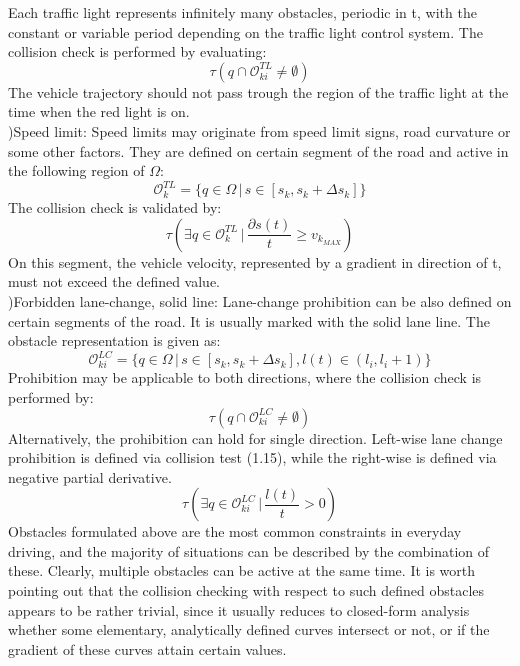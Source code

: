 \documentclass{thesisreport}
\begin{document}
Each traffic light represents infinitely many obstacles, periodic in t, with the constant or variable period depending
on the traffic light control system. The collision check is performed by evaluating:
\begin{equation}
	\tau(q \cap \mathcal{O}_{ki}^{TL} \neq \emptyset)
\end{equation}
The vehicle trajectory should not pass trough the region of the traffic light at the time when the red light is on.\\
)Speed limit: Speed limits may originate from speed limit signs, road curvature or some other factors. They are defined on certain segment of the road and active in the following region of $\Omega$:
\begin{equation}
\mathcal{O}_{k}^{TL} = \{ q \in \Omega\,|\,
s \in [s_k, s_k + \Delta s_k]\}
\end{equation}
The collision check is validated by:
\begin{equation}
\tau(\exists q \in \mathcal{O}_{k}^{TL} \,|\, \frac{\partial s(t)}{t} \geq v_{k_{MAX}} )
\end{equation}
On this segment, the vehicle velocity, represented by a gradient in direction of t, must not exceed the defined value.\\
)Forbidden lane-change, solid line: Lane-change prohibition can be also defined on certain segments of the road. It is usually marked with the solid lane line. The obstacle representation is given as:
\begin{equation}
\mathcal{O}_{ki}^{LC} = \{ q \in \Omega \,|\,s \in [s_k, s_k + \Delta s_k],l(t) \in (l_i, l_i+1) \}
\end{equation}
Prohibition may be applicable to both directions, where the collision check is performed by:
\begin{equation}
\tau(q \cap \mathcal{O}_{ki}^{LC} \neq \emptyset)
\end{equation}
Alternatively, the prohibition can hold for single direction. Left-wise lane change prohibition is defined via collision
test (1.15), while the right-wise is defined via negative partial
derivative.
\begin{equation}
\tau(\exists q \in \mathcal{O}_{ki}^{LC} \,|\, \frac{l(t)}{t} > 0)
\end{equation}
Obstacles formulated above are the most common constraints in everyday driving, and the majority of situations can be described by the combination of these. Clearly, multiple obstacles can be active at the same time. It is worth pointing out that the collision checking with respect to such defined obstacles appears to be rather trivial, since it usually reduces to closed-form analysis whether some elementary, analytically defined curves intersect or not, or if the gradient of these curves attain certain values.
\end{document}
